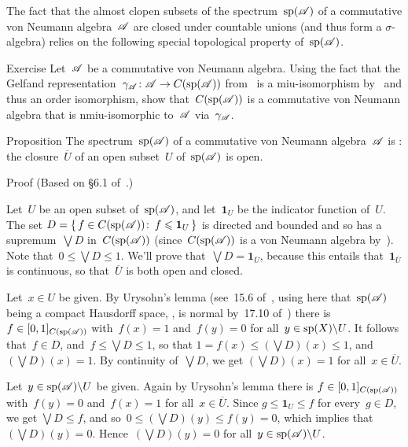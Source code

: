 \documentclass[a]{subfiles}
\begin{document}
\begin{parsec}%
\begin{point}%
The fact that the almost clopen subsets
of the spectrum~$\mathrm{sp}(\mathscr{A})$
of a commutative von Neumann algebra~$\mathscr{A}$
are closed under countable unions
(and thus form a $\sigma$-algebra)
relies on the following special topological property of~$\mathrm{sp}(\mathscr{A})$.
\end{point}
\begin{point}[ngelfand]{Exercise}%
Let~$\mathscr{A}$ be a commutative von Neumann algebra.
Using the fact that
the Gelfand representation~$\gamma_{\mathscr{A}}\colon \mathscr{A}\to C(\mathrm{sp}(\mathscr{A}))$
from~
is a miu-isomorphism 
by~
and thus an order isomorphism,
show that~$C(\mathrm{sp}(\mathscr{A}))$
is a commutative von Neumann algebra
that is nmiu-isomorphic
to~$\mathscr{A}$ via~$\gamma_{\mathscr{A}}$.
\end{point}
\begin{point}{Proposition}%
The spectrum~$\mathrm{sp}(\mathscr{A})$
of a commutative von Neumann algebra~$\mathscr{A}$
is :
the closure~$\overline{U}$
of an open subset~$U$ of~$\mathrm{sp}(\mathscr{A})$
is open.
\begin{point}{Proof}%
(Based on \S6.1 of~\cite{riesz}.)

Let~$U$ be an open subset of~$\mathrm{sp}(\mathscr{A})$,
and let~$\mathbf{1}_U$ be the indicator function
of~$U$.
The set $D=\{\,f\in C(\mathrm{sp}(\mathscr{A}))\colon\, f\leqslant \mathbf{1}_U\,\}$
is directed and bounded 
and so has a supremum~$\bigvee D$
in~$C(\mathrm{sp}(\mathscr{A}))$
(since~$C(\mathrm{sp}(\mathscr{A}))$ is a von Neumann algebra by~).
Note that~$0\leq \bigvee D\leq 1$.
We'll prove that~$\bigvee D = \mathbf{1}_{\overline{U}}$,
because this entails
that~$\mathbf{1}_{\overline{U}}$
is continuous,  so that~$\overline{U}$ is both open and closed.

Let~$x\in U$ be given.
By Urysohn's lemma (see~15.6 of~\cite{willard},
using here that~$\mathrm{sp}(\mathscr{A})$ being a compact Hausdorff
space, , 
is normal by~17.10 of~\cite{willard})
there is $f\in [0,1]_{C(\mathrm{sp}(\mathscr{A}))}$
with~$f(x)=1$ and~$f(y)=0$ for all~$y\in \mathrm{sp}(X)\backslash U$.
It follows that~$f\in D$,
and~$f\leq \bigvee D\leq 1$,
so that $1=f(x)\leq (\bigvee D)(x)\leq 1$,
and~$(\bigvee D)(x)=1$.
By continuity of~$\bigvee D$,
we get $(\bigvee D)(x)=1$ for all~$x\in \overline{U}$.

Let~$y\in \mathrm{sp}(\mathscr{A})\backslash U$ be given.
Again by Urysohn's lemma
there is $f\in [0,1]_{C(\mathrm{sp}(\mathscr{A}))}$
with~$f(y)=0$ and~$f(x)=1$ for all~$x\in \overline{U}$.
Since $g\leq \mathbf{1}_U \leq f$
for every~$g\in D$,
we get $\bigvee D\leq f$,
and so~$0\leq (\bigvee D)(y)\leq f(y) =0$,
which implies that~$(\bigvee D)(y)=0$.
Hence~$(\bigvee D)(y)=0$ for all~$y\in \mathrm{sp}(\mathscr{A})\backslash U$.


\end{point}
\end{point}
\end{parsec}
\end{document}
